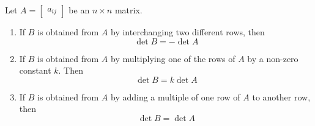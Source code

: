 \documentclass{ximera}
\begin{document}
\begin{theorem}\label{th:elemrowopsanddet}
Let $A=\begin{bmatrix}a_{ij}\end{bmatrix}$ be an $n\times n$ matrix.  
\begin{enumerate}
\item\label{item:rowswapanddet}
If $B$ is obtained from $A$ by interchanging two different rows, then $$\det{B}=-\det{A}$$
\item \label{item:rowconstantmultanddet}
If $B$ is obtained from $A$ by multiplying one of the rows of $A$ by a non-zero constant $k$.  Then $$\det{B}=k\det{A}$$
\item \label{item:addmultotherrowdet}
If $B$ is obtained from $A$ by adding a multiple of one row of $A$ to another row, then
$$\det{B}=\det{A}$$
\end{enumerate}
\end{theorem}
\end{document}
